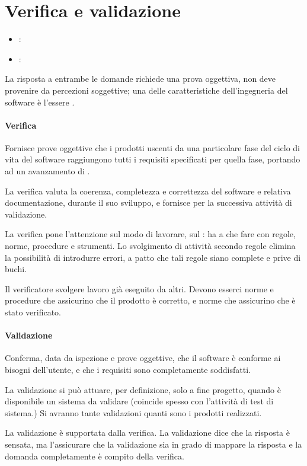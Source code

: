 \section{Verifica e validazione}
\label{sec:verifica_e_validazione}

\begin{itemize}
  \item {}: 
  \item {}: 
\end{itemize}

La risposta a entrambe le domande richiede una prova oggettiva, non deve
provenire da percezioni soggettive; una delle caratteristiche dell'ingegneria
del software è l'essere .

\paragraph{Verifica}
\label{par:verifica}

Fornisce prove oggettive che i prodotti uscenti da una particolare fase del
ciclo di vita del software raggiungono tutti i requisiti specificati per quella
fase, portando ad un avanzamento di .

La verifica valuta la coerenza, completezza e correttezza del software e
relativa documentazione, durante il suo sviluppo, e fornisce 
per la successiva attività di validazione.

La verifica pone l'attenzione sul modo di lavorare, sul : ha a
che fare con regole, norme, procedure e strumenti. Lo svolgimento di attività
secondo regole elimina la possibilità di introdurre errori, a patto che
tali regole siano complete e prive di buchi.

Il verificatore  svolgere lavoro già eseguito da altri. Devono
esserci norme e procedure che assicurino che il prodotto è corretto, e norme che
assicurino che è stato verificato.

\paragraph{Validazione}
\label{par:validazione}

Conferma, data da ispezione e prove oggettive, che il software è conforme ai
bisogni dell'utente, e che i requisiti sono completamente soddisfatti.

La validazione si può attuare, per definizione, solo a fine progetto, quando è
disponibile un sistema da validare (coincide spesso con l'attività di test di
sistema.) Si avranno tante validazioni quanti sono i prodotti realizzati.

La validazione è supportata dalla verifica. La validazione dice che la risposta
è sensata, ma l'assicurare che la validazione sia in grado di mappare la
risposta e la domanda completamente è compito della verifica.




